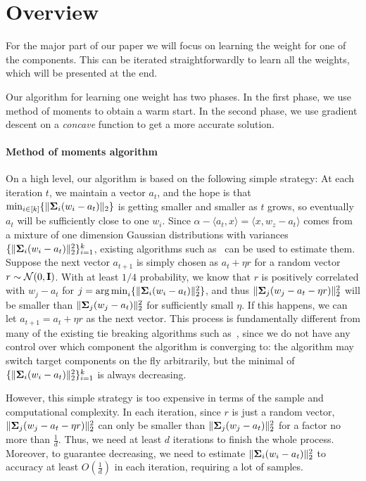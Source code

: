 \section{Overview} \label{sec:proofsketch}

For the major part of our paper we will focus on learning the weight for one of the components. This can be iterated straightforwardly to learn all the weights, which will be presented at the end. 

Our algorithm for learning one weight has two phases. In the first phase, we use method of moments to obtain a warm start. In the second phase, we use gradient descent on a \emph{concave} function to get a more accurate solution. 

\paragraph{Method of moments algorithm}
On a high level, our algorithm is based on the following simple strategy: At each iteration $t$, we maintain a vector $a_t$, and the hope is that $\min_{i \in [k]} \{ \| \bold{\Sigma}_i (w_i - a_t) \|_2\} $ is getting smaller and smaller as $t$ grows, so eventually $a_t$ will be sufficiently close to one $w_i$.  
Since $\alpha - \langle a_t, x \rangle  = \langle x, w_z - a_t \rangle $ comes from a mixture of one dimension Gaussian distributions with variances $\{ \| \bold{\Sigma}_i (w_i - a_t) \|_2^2\}_{i = 1}^k$, existing algorithms such as~\citep{moitra2010settling} can be used to estimate them. Suppose the next vector $a_{t + 1}$ is simply chosen as $a_t + \eta r$ for a random vector $r \sim \mathcal{N}(0, \bold{I})$. With at least $1/4$ probability, we know that $r$ is positively correlated with $w_j - a_t $ for $j = \operatorname*{arg\,min}_i \{ \| \bold{\Sigma}_i (w_i - a_t) \|_2^2\}$, and thus $\| \bold{\Sigma}_j (w_j - a_t - \eta r) \|_2^2$ will be smaller than $\| \bold{\Sigma}_j (w_j - a_t  ) \|_2^2$ for sufficiently small $\eta$. If this happens, we can let $a_{t + 1} = a_t + \eta r$ as the next vector. This process is fundamentally different from many of the existing tie breaking algorithms such as~\citep{li2017convergence}, since we do not have any control over which component the algorithm is converging to: the algorithm may switch target components on the fly arbitrarily, but the minimal of $\{ \| \bold{\Sigma}_i (w_i - a_t) \|_2^2\}_{i = 1}^k$ is always decreasing. 



However, this simple strategy is too expensive in terms of the sample and computational complexity. In each iteration, since $r$ is just a random vector, $\| \bold{\Sigma}_j (w_j - a_t - \eta r) \|_2^2$ can only be smaller than $\| \bold{\Sigma}_j (w_j - a_t  ) \|_2^2$  for a factor no more than $\frac{1}{d}$. Thus, we need at least $d$ iterations to finish the whole process. Moreover, to guarantee decreasing, we need to estimate $\| \bold{\Sigma}_i (w_i - a_t  ) \|_2^2$ to accuracy at least $O \left(\frac{1}{d} \right) $ in each iteration, requiring a lot of samples. 


